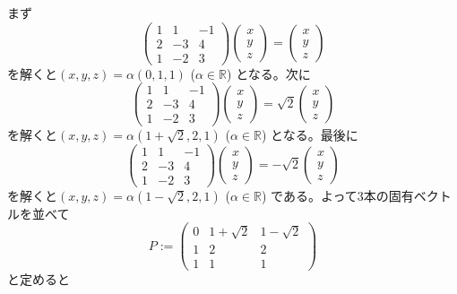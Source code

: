 まず
\[
\begin{pmatrix}
1 & 1 & -1 \\
2 & -3 & 4 \\
1 & -2 & 3
\end{pmatrix}
\begin{pmatrix}
x \\
y \\
z
\end{pmatrix}
=
\begin{pmatrix}
x \\
y \\
z
\end{pmatrix}
\]
を解くと$(x, y, z) = \alpha(0, 1, 1)$ ($\alpha \in \mathbb{R}$) となる。次に
\[
\begin{pmatrix}
1 & 1 & -1 \\
2 & -3 & 4 \\
1 & -2 & 3
\end{pmatrix}
\begin{pmatrix}
x \\
y \\
z
\end{pmatrix}
=
\sqrt{2}
\begin{pmatrix}
x \\
y \\
z
\end{pmatrix}
\]
を解くと$(x, y, z) = \alpha(1 + \sqrt{2}, 2, 1)$ ($\alpha \in \mathbb{R}$) となる。最後に
\[
\begin{pmatrix}
1 & 1 & -1 \\
2 & -3 & 4 \\
1 & -2 & 3
\end{pmatrix}
\begin{pmatrix}
x \\
y \\
z
\end{pmatrix}
=
-\sqrt{2}
\begin{pmatrix}
x \\
y \\
z
\end{pmatrix}
\]
を解くと$(x, y, z) = \alpha(1 - \sqrt{2}, 2, 1)$ ($\alpha \in \mathbb{R}$) である。よって$3$本の固有ベクトルを並べて
\[
P :=
\begin{pmatrix}
0 & 1 + \sqrt{2} & 1 - \sqrt{2} \\
1 & 2 & 2 \\
1 & 1 & 1
\end{pmatrix}
\]
と定めると
